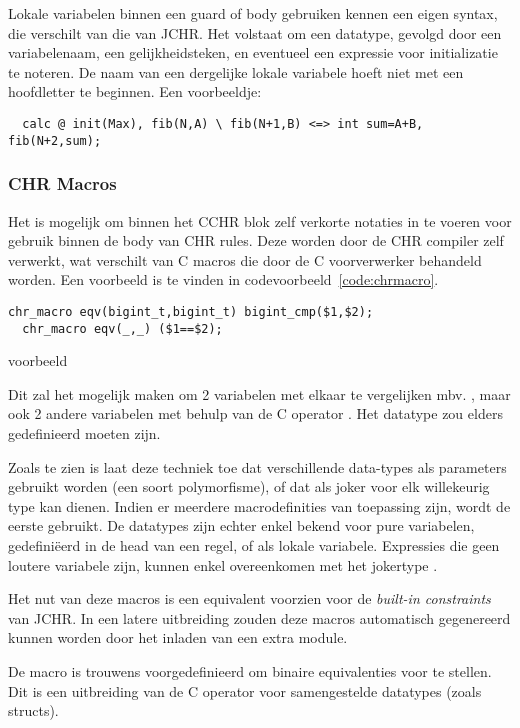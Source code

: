 Lokale variabelen binnen een guard of body gebruiken kennen een eigen syntax, die verschilt van die van JCHR. Het volstaat om een datatype, gevolgd door een variabelenaam, een gelijkheidsteken, en eventueel een expressie voor initializatie te noteren. De naam van een dergelijke lokale variabele hoeft niet met een hoofdletter te beginnen. Een voorbeeldje: \begin{Verbatim}
  calc @ init(Max), fib(N,A) \ fib(N+1,B) <=> int sum=A+B, fib(N+2,sum);
\end{Verbatim}

\subsubsection{CHR Macros}

Het is mogelijk om binnen het CCHR blok zelf verkorte notaties in te voeren voor gebruik binnen de body van CHR rules. Deze worden door de CHR compiler zelf verwerkt, wat verschilt van C macros die door de C voorverwerker behandeld worden. Een voorbeeld is te vinden in codevoorbeeld~\ref{code:chrmacro}.
\begin{exCode}
\begin{Verbatim}[frame=single]
  chr_macro eqv(bigint_t,bigint_t) bigint_cmp($1,$2);
  chr_macro eqv(_,_) ($1==$2);
\end{Verbatim}
\caption{ voorbeeld}
\label{code:chrmacro}
\end{exCode}
Dit zal het mogelijk maken om 2  variabelen met elkaar te vergelijken mbv. , maar ook 2 andere variabelen met behulp van de C operator \code{==}. Het datatype  zou elders gedefinieerd moeten zijn.

Zoals te zien is laat deze techniek toe dat verschillende data-types als parameters gebruikt worden (een soort polymorfisme), of dat \code{\_} als joker voor elk willekeurig type kan dienen. Indien er meerdere macrodefinities van toepassing zijn, wordt de eerste gebruikt. De datatypes zijn echter enkel bekend voor pure variabelen, gedefini\"eerd in de head van een regel, of als lokale variabele. Expressies die geen loutere variabele zijn, kunnen enkel overeenkomen met het jokertype \code{\_}.

Het nut van deze macros is een equivalent voorzien voor de {\em built-in constraints} van JCHR. In een latere uitbreiding zouden deze macros automatisch gegenereerd kunnen worden door het inladen van een extra module.

De macro  is trouwens voorgedefinieerd om binaire equivalenties voor te stellen. Dit is een uitbreiding van de C operator \code{==} voor samengestelde datatypes (zoals structs).

